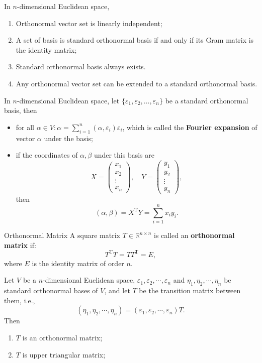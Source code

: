 \documentclass[11pt]{../../TexTemplate/elegantbook} %
\begin{document}
\begin{property}
    In \(n\)-dimensional Euclidean space, 
    \begin{enumerate}
        \item Orthonormal vector set is linearly independent;
        \item A set of basis is standard orthonormal basis if and only if its Gram matrix is the identity matrix;
        \item Standard orthonormal basis always exists.
        \item Any orthonormal vector set can be extended to a standard orthonormal basis.
    \end{enumerate}
\end{property}
In \(n\)-dimensional Euclidean space, let \( \{ \varepsilon_1, \varepsilon_2, \dots, \varepsilon_n \} \) 
be a standard orthonormal basis, then
\begin{itemize}
    \item for all \(\alpha \in V:\alpha = \sum_{i=1}^{n} (\alpha, \varepsilon_i) \varepsilon_i\), 
        which is called the \textbf{Fourier expansion} of vector \( \alpha \) under the basis;
    \item if the coordinates of \(\alpha, \beta\) under this basis are
        \[
        X = \begin{pmatrix} x_1 \\ x_2 \\ \vdots \\ x_n \end{pmatrix}, \quad
        Y = \begin{pmatrix} y_1 \\ y_2 \\ \vdots \\ y_n \end{pmatrix},
        \]
        then
        \[
        (\alpha, \beta) = X^{\mathrm{T}} Y = \sum_{i=1}^{n} x_i y_i.
        \]
\end{itemize}

\begin{definition}{Orthonormal Matrix}
    A square matrix \( T \in \mathbb{R}^{n \times n} \) is called an \textbf{orthonormal matrix} if:
    \[
    T^{\mathrm{T}} T = T T^{\mathrm{T}} = E,
    \]
    where \( E \) is the identity matrix of order \( n \).
\end{definition}
Let \( V \) be a \(n\)-dimensional Euclidean space,
\(\varepsilon_{1}, \varepsilon_{2},\cdots, \varepsilon_{n}\) and \(\eta_{1}, \eta_{2},\cdots, \eta_{n}\)
be standard orthonormal bases of \( V \), and let \( T \) be the transition matrix between them,
i.e., 
\[
(\eta_{1}, \eta_{2}, \cdots, \eta_{n}) = (\varepsilon_{1}, \varepsilon_{2}, \cdots, \varepsilon_{n}) T.
\]
Then 
\begin{enumerate}
    \item \(T\) is an orthonormal matrix; 
    \item \(T\) is upper triangular matrix;
\end{enumerate}
\end{document}
